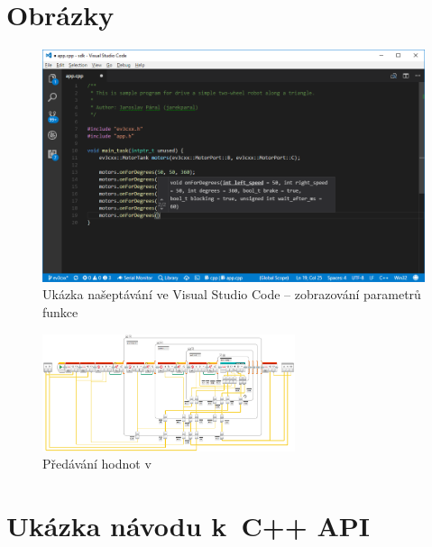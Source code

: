 \chapter{Obrázky}


\begin{figure}[h]
    \centering
    \includegraphics[width=\textwidth]{images/visual-studio-code_intellisense-param.png}
    \caption{Ukázka našeptávání ve Visual Studio Code -- zobrazování parametrů funkce}
    \label{fig:visual-studio-code_intellisense-param}
\end{figure}


\begin{figure}[h]
	\centering
	\includegraphics[angle=-90,origin=c,width=280px]{images/lego-soft_legolib_match_array_length.png}
	\caption[Předávání hodnot v~\legoSW{}]{Předávání hodnot v~\legoSW{}}
	\label{fig:lego-soft_legolib_match_array_length}
\end{figure}



\chapter{Ukázka návodu k~C++ API}



















